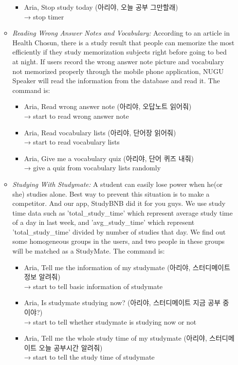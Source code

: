 \documentclass[conference]{IEEEtran}
\begin{document}
\begin{enumerate}
\begin{itemize}
\begin{itemize}
\item  Aria, Stop study today
(아리야, 오늘 공부 그만할래) \\
→ stop timer

\end{itemize}


\item \textit{Reading Wrong Answer Notes and Vocabulary:} According to an article in Health Chosun, \cite{b5} there is a study result that people can memorize the most efficiently if they study memorization subjects right before going to bed at night. If users record the wrong answer note picture and vocabulary not memorized properly through the mobile phone application, NUGU Speaker will read the information from the database and read it. The command is:

\begin{itemize}
\item Aria, Read wrong answer note
(아리야, 오답노트 읽어줘)  \\
→ start to read wrong answer note
\item Aria, Read vocabulary lists
(아리야, 단어장 읽어줘) \\
→ start to read vocabulary lists
\item Aria, Give me a vocabulary quiz
(아리야, 단어 퀴즈 내줘) \\
→ give a quiz from vocabulary lists randomly

\end{itemize}


\item \textit{Studying With Studymate:} A student can easily lose power when he(or she) studies alone. Best way to prevent this situation is to make a competitor. And our app, StudyBNB did it for you guys. We use study time data such as 'total\_study\_time' which represent average study time of a day in last week, and 'avg\_study\_time' which represent 'total\_study\_time' divided by number of studies that day. We find out some homogeneous groups in the users, and two people in these groups will be matched as a StudyMate. The command is:


 
\begin{itemize}
\item Aria, Tell me the information of my studymate
(아리야, 스터디메이트 정보 알려줘) \\
→ start to tell basic information of studymate
\item Aria, Is studymate studying now?
(아리야, 스터디메이트 지금 공부 중이야?) \\
→ start to tell whether studymate is studying now or not
\item Aria, Tell me the whole study time of my studymate
(아리야, 스터디메이트 오늘 공부시간 알려줘) \\
→ start to tell the study time of studymate

\end{itemize}

\end{itemize}


\end{enumerate}
\end{document}
